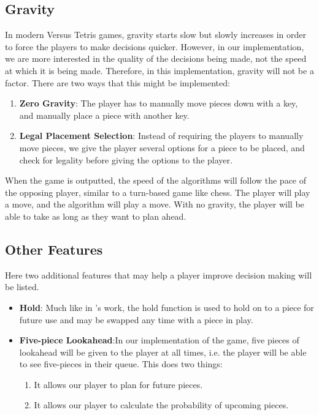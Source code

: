 \documentclass[a4paper, 12pt]{extreport}
\begin{document}
			\subsection{Gravity}
			
				In modern Versus Tetris games, gravity starts slow but slowly increases in order to force the players to make decisions quicker. However, in our implementation, we are more interested in the quality of the decisions being made, not the speed at which it is being made. Therefore, in this implementation, gravity will not be a factor. There are two ways that this might be implemented:
				
				\begin{enumerate}
					\item \textbf{Zero Gravity}: The player has to manually move pieces down with a key, and manually place a piece with another key.
					\item \textbf{Legal Placement Selection}: Instead of requiring the players to manually move pieces, we give the player several options for a piece to be placed, and check for legality before giving the options to the player.
				\end{enumerate}
				
				When the game is outputted, the speed of the algorithms will follow the pace of the opposing player, similar to a turn-based game like chess. The player will play a move, and the algorithm will play a move. With no gravity, the player will be able to take as long as they want to plan ahead.
			
			\subsection{Other Features}
			
				Here two additional features that may help a player improve decision making will be listed.
				
				\begin{itemize}
					\item \textbf{Hold}: Much like in \citeauthor{tetris-drl-2}'s \cite{tetris-drl-2} work, the hold function is used to hold on to a piece for future use and may be swapped any time with a piece in play.
					\item \textbf{Five-piece Lookahead}:In our implementation of the game, five pieces of lookahead will be given to the player at all times, i.e. the player will be able to see five-pieces in their queue. This does two things:
					\begin{enumerate}
						\item It allows our player to plan for future pieces.
						\item It allows our player to calculate the probability of upcoming pieces.
					\end{enumerate}
				\end{itemize}
		
\end{document}

